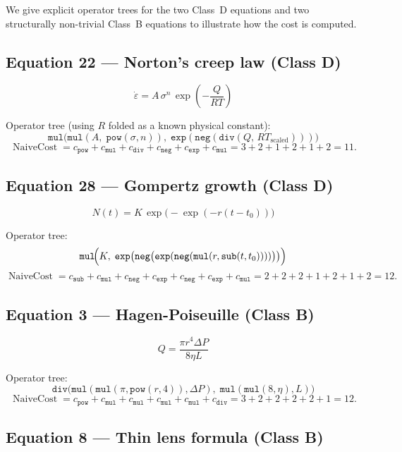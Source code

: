 \documentclass[12pt,a4paper]{article}
\theoremstyle{definition}
\newcommand{\NC}{\operatorname{NaiveCost}}
\begin{document}
We give explicit operator trees for the two Class~D equations and two
structurally non-trivial Class~B equations to illustrate how the cost
is computed.

\subsection{Equation 22 — Norton's creep law (Class D)}

\[
  \dot{\varepsilon} = A\,\sigma^n\,\exp\!\left(-\dfrac{Q}{RT}\right)
\]

Operator tree (using $R$ folded as a known physical constant):
\[
  \texttt{mul}\!\bigl(\texttt{mul}(A,\;\texttt{pow}(\sigma,n)),\;
    \texttt{exp}(\texttt{neg}(\texttt{div}(Q,\,RT_{\text{scaled}})))\bigr)
\]
\[
  \NC = c_{\texttt{pow}} + c_{\texttt{mul}} + c_{\texttt{div}}
       + c_{\texttt{neg}} + c_{\texttt{exp}} + c_{\texttt{mul}}
      = 3 + 2 + 1 + 2 + 1 + 2 = 11.
\]

\subsection{Equation 28 — Gompertz growth (Class D)}

\[
  N(t) = K\,\exp\!\bigl(-\exp(-r(t-t_0))\bigr)
\]

Operator tree:
\[
  \texttt{mul}\!\Bigl(K,\;
    \texttt{exp}\bigl(\texttt{neg}\bigl(
      \texttt{exp}(\texttt{neg}(\texttt{mul}(r,\texttt{sub}(t,t_0))))\bigr)
    \bigr)\Bigr)
\]
\[
  \NC = c_{\texttt{sub}} + c_{\texttt{mul}} + c_{\texttt{neg}}
       + c_{\texttt{exp}} + c_{\texttt{neg}} + c_{\texttt{exp}}
       + c_{\texttt{mul}}
      = 2 + 2 + 2 + 1 + 2 + 1 + 2 = 12.
\]

\subsection{Equation 3 — Hagen-Poiseuille (Class B)}

\[
  Q = \frac{\pi r^4 \Delta P}{8\eta L}
\]

Operator tree:
\[
  \texttt{div}\!\bigl(
    \texttt{mul}(\texttt{mul}(\pi,\texttt{pow}(r,4)),\Delta P),\;
    \texttt{mul}(\texttt{mul}(8,\eta),L)
  \bigr)
\]
\[
  \NC = c_{\texttt{pow}} + c_{\texttt{mul}} + c_{\texttt{mul}}
       + c_{\texttt{mul}} + c_{\texttt{mul}} + c_{\texttt{div}}
      = 3 + 2 + 2 + 2 + 2 + 1 = 12.
\]

\subsection{Equation 8 — Thin lens formula (Class B)}
\end{document}
